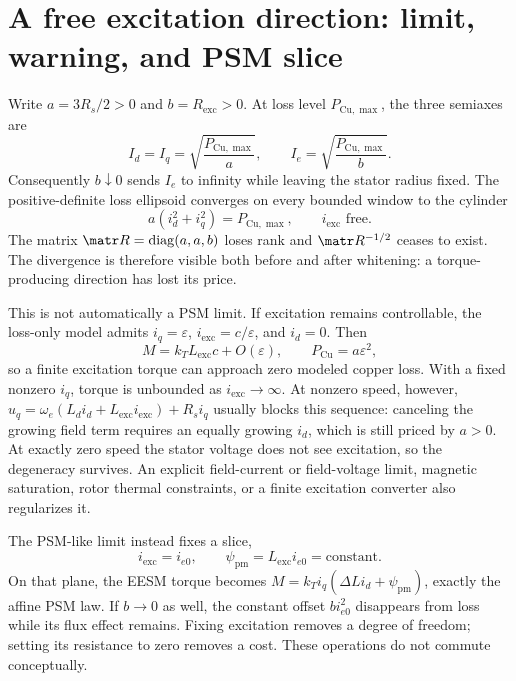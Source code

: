 \section{A free excitation direction: limit, warning, and PSM slice}
\label{sec:loss-degeneracy}

Write \(a=3R_s/2>0\) and \(b=R_{\mathrm{exc}}>0\).  At loss level
\(P_{\mathrm{Cu},\max}\), the three semiaxes are
\begin{equation}
 I_d=I_q=\sqrt{\frac{P_{\mathrm{Cu},\max}}{a}},\qquad
 I_e=\sqrt{\frac{P_{\mathrm{Cu},\max}}{b}}.
 \label{eq:loss-semiaxes}
\end{equation}
Consequently \(b\downarrow0\) sends \(I_e\) to infinity while leaving the
stator radius fixed.  The positive-definite loss ellipsoid converges on every
bounded window to the cylinder
\begin{equation}
 \boxed{a(i_d^2+i_q^2)=P_{\mathrm{Cu},\max},
 \qquad i_{\mathrm{exc}}\text{ free}.}
 \label{eq:loss-cylinder}
\end{equation}
The matrix \(\matr R=\operatorname{diag}(a,a,b)\) loses rank and
\(\matr R^{-1/2}\) ceases to exist.  The divergence is therefore visible both
before and after whitening: a torque-producing direction has lost its price.



This is not automatically a PSM limit.  If excitation remains controllable,
the loss-only model admits \(i_q=\varepsilon\),
\(i_{\mathrm{exc}}=c/\varepsilon\), and \(i_d=0\).  Then
\begin{equation}
 M=k_TL_{\mathrm{exc}}c+O(\varepsilon),\qquad
 P_{\mathrm{Cu}}=a\varepsilon^2,
 \label{eq:free-field-scaling}
\end{equation}
so a finite excitation torque can approach zero modeled copper loss.  With a
fixed nonzero \(i_q\), torque is unbounded as \(i_{\mathrm{exc}}\to\infty\).
At nonzero speed, however,
\(u_q=\omega_e(L_di_d+L_{\mathrm{exc}}i_{\mathrm{exc}})+R_si_q\)
usually blocks this sequence: canceling the growing field term requires an
equally growing \(i_d\), which is still priced by \(a>0\).  At exactly zero
speed the stator voltage does not see excitation, so the degeneracy survives.
An explicit field-current or field-voltage limit, magnetic saturation, rotor
thermal constraints, or a finite excitation converter also regularizes it.

The PSM-like limit instead fixes a slice,
\begin{equation}
 i_{\mathrm{exc}}=i_{e0},\qquad
 \psi_{\mathrm{pm}}=L_{\mathrm{exc}}i_{e0}=\text{constant}.
 \label{eq:fixed-excitation-limit}
\end{equation}
On that plane, the EESM torque becomes
\(M=k_Ti_q(\Delta L i_d+\psi_{\mathrm{pm}})\), exactly the affine PSM
law.  If \(b\to0\) as well, the constant offset \(b i_{e0}^2\) disappears
from loss while its flux effect remains.  Fixing excitation removes a degree
of freedom; setting its resistance to zero removes a cost.  These operations
do not commute conceptually.

